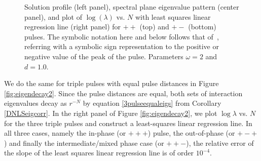 \documentclass[12pt]{elsarticle}
\begin{document}
\begin{figure}[H]
\caption{Solution profile (left panel), spectral plane eigenvalue pattern (center panel), and plot of $\log(\lambda)$ vs. $N$ with least squares linear regression line (right panel) for $++$ (top) and $+-$ (bottom) pulses. The symbolic notation here and 
below follows that of~\cite{alfimov}, referring
with a symbolic sign representation to the positive
or negative value of the peak of the pulse.
Parameters $\omega = 2$ and $d = 1.0$.}
\label{fig:eigendecay1}
\end{figure}

We do the same for triple pulses with equal pulse distances in Figure \ref{fig:eigendecay2}. Since the pulse distances are equal, both sets of interaction eigenvalues decay as $r^{-N}$ by equation \eqref{3pulseequaleigs} from Corollary \ref{DNLSeigcorr}. In the right panel of Figure \ref{fig:eigendecay2}, we plot $\log \lambda$ vs. $N$ for the three triple pulses and construct a least-squares linear regression line. In all three cases, 
namely the in-phase (or $+++$) pulse, the 
out-of-phase (or $+-+$) and finally the 
intermediate/mixed phase case
(or $++-$), the relative error of the slope of the least squares linear regression line is of order $10^{-4}$. 
\end{document}
